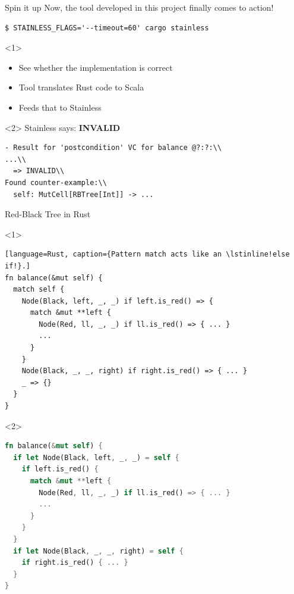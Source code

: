 \begin{frame}[fragile]{Spin it up}
Now, the tool developed in this project finally comes to action! \\
\begin{lstlisting}[style=short]
$ STAINLESS_FLAGS='--timeout=60' cargo stainless
\end{lstlisting}
\vfill
\begin{onlyenv}<1>
\begin{itemize}
  \item See whether the implementation is correct
  \item Tool translates Rust code to Scala
  \item Feeds that to Stainless
\end{itemize}
\end{onlyenv}

\begin{onlyenv}<2>
Stainless says:
\textbf{\alert{INVALID}}
\begin{lstlisting}[style=short]
- Result for 'postcondition' VC for balance @?:?:\\
...\\
  => INVALID\\
Found counter-example:\\
  self: MutCell[RBTree[Int]] -> ...
\end{lstlisting}
\end{onlyenv}
\end{frame}

\begin{frame}[fragile]{Red-Black Tree in Rust}
\begin{onlyenv}<1>
\begin{lstlisting}[language=Rust, caption={Pattern match acts like an \lstinline!else if!}.]
fn balance(&mut self) {
  match self {
    Node(Black, left, _, _) if left.is_red() => {
      match &mut **left {
        Node(Red, ll, _, _) if ll.is_red() => { ... }
        ...
      }
    }
    Node(Black, _, _, right) if right.is_red() => { ... }
    _ => {}
  }
}
\end{lstlisting}
\end{onlyenv}
\begin{onlyenv}<2>
\begin{lstlisting}[language=Rust, caption={Solved bug in balance function.}]
fn balance(&mut self) {
  if let Node(Black, left, _, _) = self {
    if left.is_red() {
      match &mut **left {
        Node(Red, ll, _, _) if ll.is_red() => { ... }
        ...
      }
    }
  }
  if let Node(Black, _, _, right) = self {
    if right.is_red() { ... }
  }
}
\end{lstlisting}
\end{onlyenv}
\end{frame}

